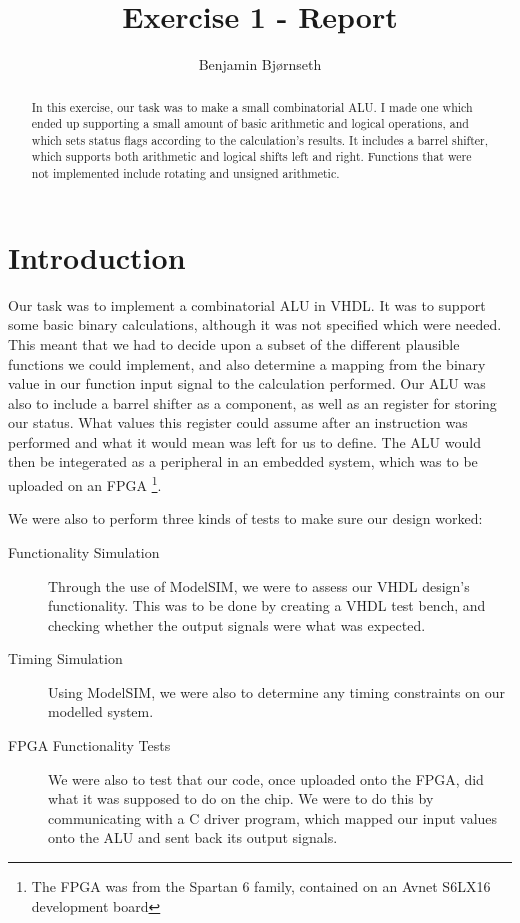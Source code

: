 \documentclass{article}
\title{Exercise 1 - Report}
\author{Benjamin Bj\o rnseth}
\begin{document}
\maketitle 
\begin{abstract}
In this exercise, our task was to make a small combinatorial ALU. I made one which ended up supporting a small amount of basic arithmetic and logical operations, and which sets status flags according to the calculation's results. It includes a barrel shifter, which supports both arithmetic and logical shifts left and right. Functions that were not implemented include rotating and unsigned arithmetic.
\end{abstract}

\section{Introduction}
\label{sec:introduction}
Our task was to implement a combinatorial ALU in VHDL. It was to support some basic binary calculations, although it was not specified which were needed. This meant that we had to decide upon a subset of the different plausible functions we could implement, and also determine a mapping from the binary value in our function input signal to the calculation performed. Our ALU was also to include a barrel shifter as a component, as well as an register for storing our status. What values this register could assume after an instruction was performed and what it would mean was left for us to define. The ALU would then be integerated as a peripheral in an embedded system, which was to be uploaded on an FPGA \footnote{The FPGA was from the Spartan 6 family, contained on an Avnet S6LX16 development board}. 

We were also to perform three kinds of tests to make sure our design worked:
\begin{description}
\item[Functionality Simulation] Through the use of ModelSIM, we were to assess our VHDL design's functionality. This was to be done by creating a VHDL test bench, and checking whether the output signals were what was expected.
\item[Timing Simulation] Using ModelSIM, we were also to determine any timing constraints on our modelled system.
\item[FPGA Functionality Tests] We were also to test that our code, once uploaded onto the FPGA, did what it was supposed to do on the chip. We were to do this by communicating with a C driver program, which mapped our input values onto the ALU and sent back its output signals.
\end{description}
\end{document}
